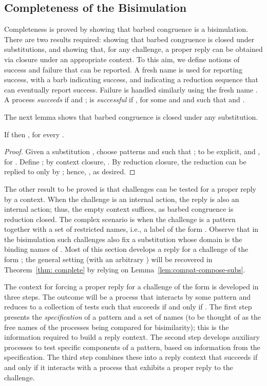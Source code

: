\documentclass{LMCS}
\begin{document}
\subsection{Completeness of the Bisimulation}

Completeness is proved by showing that barbed congruence is a bisimulation.
There are two results required:
showing that barbed congruence is closed under substitutions,
and showing that, for any challenge, a proper reply can be obtained via closure under an appropriate context.
To this aim, we define notions of success and failure that can be reported.
A fresh name  is used for reporting success, with a barb  indicating success, and  indicating a reduction sequence that can eventually report success. Failure is handled similarly using the fresh name .
A process  {\em succeeds} 
if  and ;
 is {\em successful} if , for some  and  and  
such that  and .

The next lemma shows that barbed congruence is closed under any substitution.

\begin{lem}
\label{lem:bcon-sub}
If  then , for every .
\end{lem}
\begin{proof}
Given a substitution , choose patterns  and  such that ;
to be explicit,  and ,
for .
Define ;
by context closure, .
By reduction closure, the reduction  can be replied to 
only by ; hence, , as desired.
\end{proof}

The other result to be proved is that challenges can be tested for a proper reply by a context.
When the challenge is an internal action, the reply is also an internal action; thus, the empty 
context suffices, as barbed congruence is reduction closed.
The complex scenario is when the challenge is a pattern together with a set of restricted names, 
i.e., a label of the form .
Observe that in the bisimulation such challenges also fix a substitution  whose domain is the binding names of .
Most of this section develops a reply for a challenge of the form ;
the general setting (with an arbitrary ) will be recovered in Theorem~\ref{thm: complete}
by relying on Lemma~\ref{lem:compat-compose-subs}.

The context for forcing a proper reply for a challenge of the form  is developed in three steps.
The outcome will be a process that interacts by some pattern  and reduces to a collection of tests  such that  succeeds
if and only if .
The first step presents the {\em specification} of a pattern and a set of names  (to be thought of as the free names of the processes being compared for bisimilarity); this is the information required to build a reply context.
The second step develops auxiliary processes to test specific components of a pattern, based on information from the specification.
The third step combines these into a reply context that succeeds if and only if it interacts 
with a process that exhibits a proper reply to the challenge.
\end{document}
